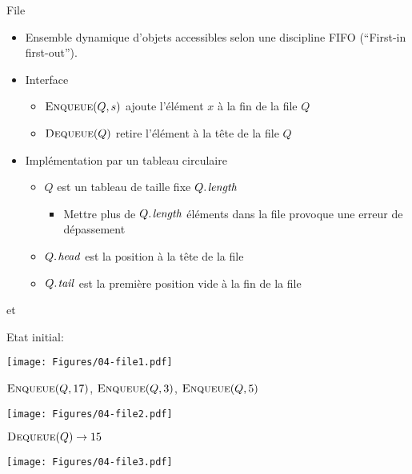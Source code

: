 \begin{frame}{File}
\begin{itemize}
\item Ensemble dynamique d'objets accessibles selon une discipline \alert{FIFO} (``First-in first-out'').
\item Interface
\begin{itemize}
\item $\textnormal{\scshape Enqueue}(Q,s)$ ajoute l'élément $x$ à la fin de la file $Q$
\item $\textnormal{\scshape Dequeue}(Q)$  retire l'élément à la tête de la file $Q$
\end{itemize}

\bigskip

\item Implémentation par un tableau circulaire
\begin{itemize}
\item $Q$ est un tableau de taille fixe $\attrib{Q}{length}$
\begin{itemize}
\item Mettre plus de $\attrib{Q}{length}$ éléments dans la file provoque une erreur de dépassement
\end{itemize}
\item $\attrib{Q}{head}$  est la position à la tête de la file
\item $\attrib{Q}{tail}$ est la première position vide à la fin de la file
\end{itemize}
\end{itemize}
\end{frame}

\begin{frame}{ et }
\begin{small}
Etat initial:
\bigskip
\centerline{\texttt{[image: Figures/04-file1.pdf]}}
$\textnormal{\scshape Enqueue}(Q,17)$, $\textnormal{\scshape Enqueue}(Q,3)$, $\textnormal{\scshape Enqueue}(Q,5)$
\bigskip
\centerline{\texttt{[image: Figures/04-file2.pdf]}}
$\textnormal{\scshape Dequeue}(Q) \rightarrow 15$
\bigskip
\centerline{\texttt{[image: Figures/04-file3.pdf]}}
\end{small}
\end{frame}


